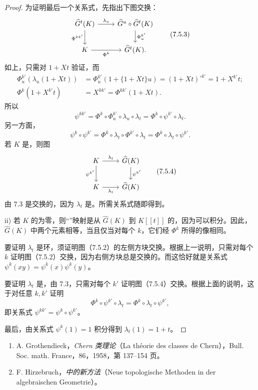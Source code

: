 \begin{proof}
为证明最后一个关系式，先指出下图交换：
\[
\begin{tikzcd}
\widehat G^t(K) \arrow[r,"\lambda_u"] \arrow[d,"\Phi^{kk'}"'] &
 \widehat G^u\circ\widehat G^t(K) \arrow[d,"\Phi_u^{k'}"]\\
K \arrow[r,"\Phi^k"'] & \widehat G^t(K).
\end{tikzcd}
\tag{7.5.3}
\]
如上，只需对 $1+Xt$ 验证，而
\[
\begin{aligned}
\Phi_u^{k'}(\lambda_u(1+Xt))
 &=\Phi_u^{k'}(1+\{1+Xt\}u)
 =(1+Xt)^{\circ k'}=1+X^{k'}t;\\
\Phi^k(1+X^{k'}t)&=X^{kk'}=\Phi^{kk'}(1+Xt).
\end{aligned}
\]
所以
\[
\psi^{kk'}
 =\Phi^k\circ\Phi_u^{k'}\circ\lambda_u\circ\lambda_t
 =\Phi^k\circ\psi^{k'}\circ\lambda_t.
\]
另一方面，
\[
\psi^k\circ\psi^{k'}
 =\Phi^k\circ\lambda_t\circ\Phi^{k'}\circ\lambda_t
 =\Phi^k\circ\lambda_t\circ\psi^{k'}.
\]
若 $K$ 是，则图
\[
\begin{tikzcd}
K \arrow[r,"\lambda_t"] \arrow[d,"\psi^{k'}"'] &
 \widehat G(K) \arrow[d,"\psi^{k'}"]\\
K \arrow[r,"\lambda_t"'] & \widehat G(K)
\end{tikzcd}
\tag{7.5.4}
\]
由 7.3 是交换的，因为 $\lambda_t$ 是。所需关系式随即得到。

\textup{ii)} 若 $K$ 的为零，则“”映射是从 $\widehat G(K)$ 到 $K[[t]]$ 的，因为可以积分。因此，$\widehat G(K)$ 中两个元素相等，当且仅当对每个 $k$，它们经 $\Phi^k$ 所得的像相同。

要证明 $\lambda_t$ 是环，须证明图（7.5.2）的左侧方块交换。根据上一说明，只需对每个 $k$ 证明图（7.5.2）交换，因为右侧方块总是交换的。而这恰好就是关系式
$\psi^k(xy)=\psi^k(x)\psi^k(y)$。

要证明 $\lambda_t$ 是，由 7.3，只需对每个 $k'$ 证明图（7.5.4）交换。根据上面的说明，这于对任意 $k,k'$ 证明
\[
\Phi^k\circ\psi^{k'}\circ\lambda_t
 =\Phi^k\circ\lambda_t\circ\psi^{k'},
\]
即关系式 $\psi^{kk'}=\psi^k\circ\psi^{k'}$。

最后，由关系式 $\psi^k(1)=1$ 积分得到 $\lambda_t(1)=1+t$。
\end{proof}

\begin{enumerate}
\item[{[1]}] A. Grothendieck，\emph{Chern 类理论}（La théorie des classes de Chern），Bull. Soc. math. France，86，1958，第 137--154 页。
\item[{[2]}] F. Hirzebruch，\emph{中的新方法}（Neue topologische Methoden in der algebraischen Geometrie）。
\end{enumerate}
